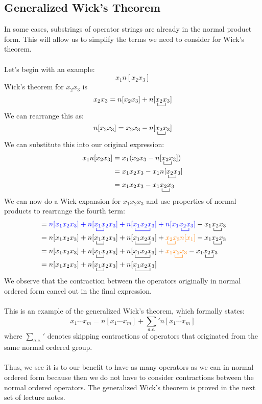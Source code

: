 \documentclass{article}
\newcommand{\ol}{\overline}
\newcommand{\ctr}{\bcontraction}
\newcommand{\cd}{\ensuremath{\cdots} }
\def\co#1{{\color{orange}#1}}
\begin{document}
\subsection{Generalized Wick's Theorem}
In some cases, substrings of operator strings are already in the normal product form.
This will allow us to simplify the terms we need to consider for Wick's theorem. \\ \\
Let's begin with an example: 
\[x_1 n[x_2 x_3] \] 
Wick's theorem for $x_2 x_3$ is
\[ x_2 x_3 = n[x_2 x_3] +   n[\ctr{}{x}{{}_2}{x} x_2 x_3] \]
We can rearrange this as: 
\[n[x_2 x_3]  = x_2 x_3  - n[\ctr{}{x}{{}_2}{x} x_2 x_3]  \]
We can substitute this into our original expression: 
\begin{align*}
x_1 n[x_2 x_3] &= x_1 (x_2 x_3  - n[\ctr{}{x}{{}_2}{x} x_2 x_3] ) \\
&=  x_1 x_2 x_3 - x_1n[\ctr{}{x}{{}_2}{x} x_2 x_3] \\
&= x_1 x_2 x_3- x_1\ctr{}{x}{{}_2}{x} x_2 x_3 \\
\end{align*}
We can now do a Wick expansion for $x_1x_2x_3$ and use properties of normal products to rearrange the fourth term:
\begin{align*}
&= {\color{blue} n[x_1x_2x_3] + n[\ctr{}{x}{{}_1}{x} x_1 x_2 x_3] +n[\ctr{}{x}{{}_1 x_2}{x} x_1 x_2 x_3] + n[\ctr{x_1}{x}{{}_2}{x} x_1 x_2 x_3] }  - x_1\ctr{}{x}{{}_2}{x} x_2 x_3 \\
&=   n[x_1x_2x_3] + n[\ctr{}{x}{{}_1}{x} x_1 x_2 x_3] +n[\ctr{}{x}{{}_1 x_2}{x} x_1 x_2 x_3] + \co{\ctr{}{x}{{}_2}{x} x_2 x_3 n[x_1]}   - x_1\ctr{}{x}{{}_2}{x} x_2 x_3 \\
&= n[x_1x_2x_3] + n[\ctr{}{x}{{}_1}{x} x_1 x_2 x_3] +n[\ctr{}{x}{{}_1 x_2}{x} x_1 x_2 x_3] + \co{x_1\ctr{}{x}{{}_2}{x} x_2 x_3  }  - x_1\ctr{}{x}{{}_2}{x} x_2 x_3 \\
&=  n[x_1x_2x_3] + n[\ctr{}{x}{{}_1}{x} x_1 x_2 x_3] +n[\ctr{}{x}{{}_1 x_2}{x} x_1 x_2 x_3] 
\end{align*}
We observe that the contraction between the operators originally in normal ordered form cancel out in the final expression.
\\ \\
This is an example of the generalized Wick's theorem, which formally states: 
$$x_1 \cd x_m = n[x_1 \cd x_m ]  + \sum_{a.c.} {}' n\ol{[x_1 \cd x_m ]} $$
where $\sum_{a.c.} {}' $ denotes skipping contractions of operators that originated from the same normal ordered group. 
\\ \\
Thus, we see it is to our benefit to have as many operators as we can in normal ordered form because then we do not have to consider contractions between the normal ordered operators. 
The generalized Wick's theorem is proved in the next set of lecture notes.
\end{document}
